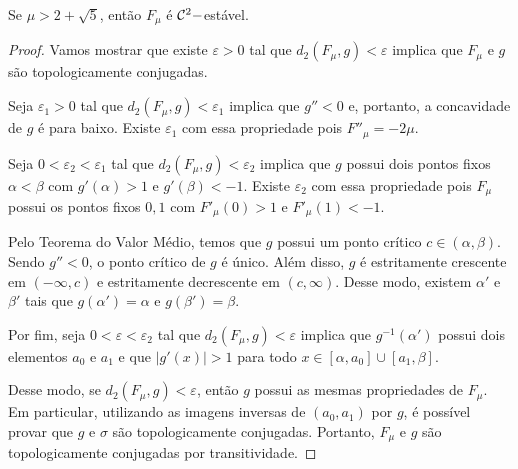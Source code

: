 \begin{theorem}
Se $\mu > 2 + \sqrt{5}$, então $F_\mu$ é $\mathcal{C}^2-$estável.
\end{theorem}

\begin{proof}
Vamos mostrar que existe $\varepsilon > 0$ tal que $d_2(F_\mu, g) < \varepsilon$ implica que $F_\mu$ e $g$ são topologicamente conjugadas.

Seja $\varepsilon_1 > 0$ tal que $d_2(F_\mu, g) < \varepsilon_1$ implica que $g'' < 0$ e, portanto, a concavidade de $g$ é para baixo. Existe $\varepsilon_1$ com essa propriedade pois $F''_\mu = -2\mu$. 

Seja $0 < \varepsilon_2 < \varepsilon_1$ tal que $d_2(F_\mu, g) < \varepsilon_2$ implica que $g$ possui dois pontos fixos $\alpha < \beta$ com $g'(\alpha) > 1$ e $g'(\beta) < -1$. Existe $\varepsilon_2$ com essa propriedade pois $F_\mu$ possui os pontos fixos $0, 1$ com $F'_\mu(0) > 1$ e $F'_\mu(1) < -1$.

Pelo Teorema do Valor Médio, temos que $g$ possui um ponto crítico $c \in (\alpha, \beta)$. Sendo $g'' < 0$, o ponto crítico de $g$ é único. Além disso, $g$ é estritamente crescente em $(-\infty, c)$ e estritamente decrescente em $(c, \infty)$. Desse modo, existem $\alpha'$ e $\beta'$ tais que $g(\alpha') = \alpha$ e $g(\beta') = \beta$.

Por fim, seja $0 < \varepsilon < \varepsilon_2$ tal que $d_2(F_\mu, g) < \varepsilon$ implica que $g^{-1}(\alpha')$ possui dois elementos $a_0$ e $a_1$ e que $|g'(x)| > 1$ para todo $x \in [\alpha, a_0] \cup [a_1, \beta]$.

Desse modo, se $d_2(F_\mu, g) < \varepsilon$, então $g$ possui as mesmas propriedades de $F_\mu$. Em particular, utilizando as imagens inversas de $(a_0, a_1)$ por $g$, é possível provar que $g$ e $\sigma$ são topologicamente conjugadas. Portanto, $F_\mu$ e $g$ são topologicamente conjugadas por transitividade.
\end{proof}
















